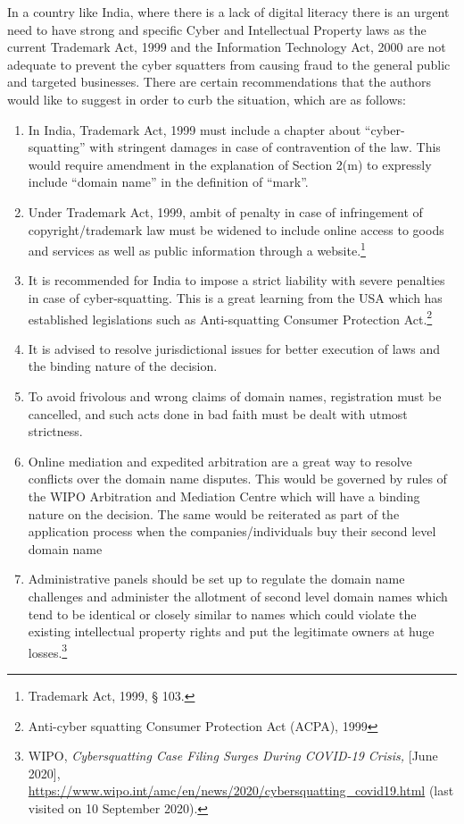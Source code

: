 \begin{multicols}{2}
\noi
In a country like India, where there is a lack of digital literacy there is an urgent need to have
strong and specific Cyber and Intellectual Property laws as the current Trademark Act, 1999
and the Information Technology Act, 2000 are not adequate to prevent the cyber squatters
from causing fraud to the general public and targeted businesses. There are certain
recommendations that the authors would like to suggest in order to curb the situation, which
are as follows:

\begin{enumerate}[label=$\bullet$]
\itemsep=0pt
\item In India, Trademark Act, 1999 must include a chapter about “cyber-squatting” with
stringent damages in case of contravention of the law. This would require amendment
in the explanation of Section 2(m) to expressly include “domain name” in the
definition of “mark”.

\item Under Trademark Act, 1999, ambit of penalty in case of infringement of
copyright/trademark law must be widened to include online access to goods and
services as well as public information through a website.\footnote{Trademark Act, 1999, § 103.}

\item It is recommended for India to impose a strict liability with severe penalties in case of
cyber-squatting. This is a great learning from the USA which has established
legislations such as Anti-squatting Consumer Protection Act.\footnote{Anti-cyber squatting Consumer Protection Act (ACPA), 1999}

\item It is advised to resolve jurisdictional issues for better execution of laws and the
binding nature of the decision.

\item To avoid frivolous and wrong claims of domain names, registration must be
cancelled, and such acts done in bad faith must be dealt with utmost strictness.

\item Online mediation and expedited arbitration are a great way to resolve conflicts over
the domain name disputes. This would be governed by rules of the WIPO Arbitration
and Mediation Centre which will have a binding nature on the decision. The same
would be reiterated as part of the application process when the companies/individuals
buy their second level domain name

\item Administrative panels should be set up to regulate the domain name challenges and
administer the allotment of second level domain names which tend to be identical or
closely similar to names which could violate the existing intellectual property rights
and put the legitimate owners at huge losses.\footnote{WIPO, \textit{Cybersquatting Case Filing Surges During COVID-19 Crisis,} [June 2020], \url{https://www.wipo.int/amc/en/news/2020/cybersquatting_covid19.html} (last visited on 10 September 2020).}


\end{enumerate}
\end{multicols}
